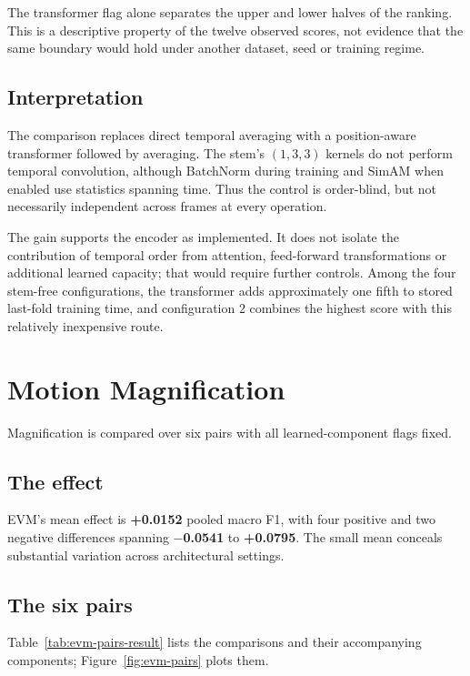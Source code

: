 The transformer flag alone separates the upper and lower halves of the ranking. This is a descriptive property of the twelve observed scores, not evidence that the same boundary would hold under another dataset, seed or training regime.

\subsection{Interpretation}
\label{sec:transformer-interpretation}

The comparison replaces direct temporal averaging with a position-aware transformer followed by averaging. The stem's $(1,3,3)$ kernels do not perform temporal convolution, although BatchNorm during training and SimAM when enabled use statistics spanning time. Thus the control is order-blind, but not necessarily independent across frames at every operation.

The gain supports the encoder as implemented. It does not isolate the contribution of temporal order from attention, feed-forward transformations or additional learned capacity; that would require further controls. Among the four stem-free configurations, the transformer adds approximately one fifth to stored last-fold training time, and configuration 2 combines the highest score with this relatively inexpensive route.

\section{Motion Magnification}
\label{sec:evm-results}

Magnification is compared over six pairs with all learned-component flags fixed.

\subsection{The effect}
\label{sec:evm-effect-result}

EVM's mean effect is \textbf{+0.0152} pooled macro F1, with four positive and two negative differences spanning \textbf{$-$0.0541} to \textbf{+0.0795}. The small mean conceals substantial variation across architectural settings.

\subsection{The six pairs}
\label{sec:evm-six-pairs}

Table~\ref{tab:evm-pairs-result} lists the comparisons and their accompanying components; Figure~\ref{fig:evm-pairs} plots them.


